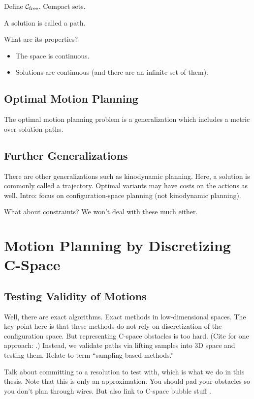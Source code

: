 Define $\mathcal{C}_{\mbox{\scriptsize free}}$.
Compact sets.

A solution is called a path.

What are its properties?

\begin{itemize}
\item The space is continuous.
\item Solutions are continuous (and there are an infinite set of them).
\end{itemize}

\subsection{Optimal Motion Planning}

The optimal motion planning problem is a generalization which
includes a metric over solution paths.

\subsection{Further Generalizations}

There are other generalizations such as kinodynamic planning.
Here, a solution is commonly called a trajectory.
Optimal variants may have costs on the actions as well.
Intro: focus on configuration-space planning (not kinodynamic planning).

What about constraints? We won't deal with these much either.

\section{Motion Planning by Discretizing C-Space}

\subsection{Testing Validity of Motions}

Well, there are exact algorithms.
Exact methods in low-dimensional spaces.
The key point here is that these methods do not rely on discretization
of the configuration space.
But representing C-space obstacles is too hard.
(Cite for one approach: \citep{lozanoperez1983cspace}.)
Instead, we validate paths via lifting samples
into 3D space and testing them.
Relate to term ``sampling-based methods.''

Talk about committing to a resolution to test with,
which is what we do in this thesis.
Note that this is only an approximation.
You should pad your obstacles so you don't plan through wires.
But also link to C-space bubble stuff
\citep{quinlan1994modification}.

